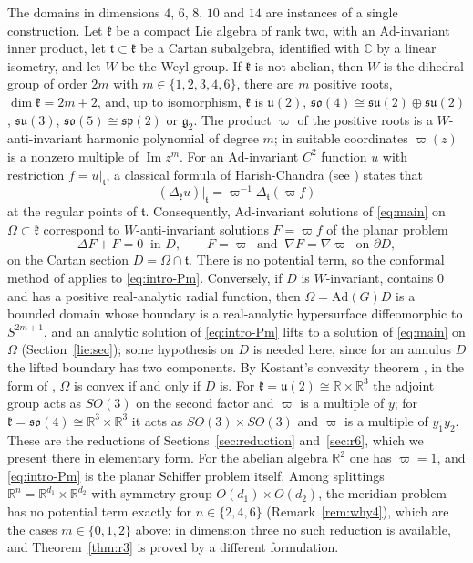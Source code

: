 \documentclass[11pt]{amsart}
\theoremstyle{definition}
\theoremstyle{remark}
\numberwithin{equation}{section}
\newcommand{\R}{\mathbb{R}}
\newcommand{\C}{\mathbb{C}}
\DeclareMathOperator{\im}{Im}
\begin{document}
The domains in dimensions $4$, $6$, $8$, $10$ and $14$ are instances of a single construction. Let $\mathfrak k$ be a compact Lie algebra of rank two, with an $\mathrm{Ad}$-invariant inner product, let $\mathfrak t\subset\mathfrak k$ be a Cartan subalgebra, identified with $\C$ by a linear isometry, and let $W$ be the Weyl group. If $\mathfrak k$ is not abelian, then $W$ is the dihedral group of order $2m$ with $m\in\{1,2,3,4,6\}$, there are $m$ positive roots, $\dim\mathfrak k=2m+2$, and, up to isomorphism, $\mathfrak k$ is $\mathfrak u(2)$, $\mathfrak{so}(4)\cong\mathfrak{su}(2)\oplus\mathfrak{su}(2)$, $\mathfrak{su}(3)$, $\mathfrak{so}(5)\cong\mathfrak{sp}(2)$ or $\mathfrak g_2$. The product $\varpi$ of the positive roots is a $W$-anti-invariant harmonic polynomial of degree $m$; in suitable coordinates $\varpi(z)$ is a nonzero multiple of $\im z^m$. For an $\mathrm{Ad}$-invariant $C^2$ function $u$ with restriction $f=u|_{\mathfrak t}$, a classical formula of Harish-Chandra \cite{HC57} (see \cite[Ch.~II]{Hel84}) states that
\begin{equation}\label{eq:radial-part}
(\Delta_{\mathfrak k}u)|_{\mathfrak t}=\varpi^{-1}\Delta_{\mathfrak t}(\varpi f)
\end{equation}
at the regular points of $\mathfrak t$. Consequently, $\mathrm{Ad}$-invariant solutions of \eqref{eq:main} on $\Omega\subset\mathfrak k$ correspond to $W$-anti-invariant solutions $F=\varpi f$ of the planar problem
\begin{equation}\label{eq:intro-Pm}
\Delta F+F=0\ \text{ in }D,\qquad F=\varpi\ \text{ and }\ \nabla F=\nabla\varpi\ \text{ on }\partial D,
\end{equation}
on the Cartan section $D=\Omega\cap\mathfrak t$. There is no potential term, so the conformal method of \cite{CS26} applies to \eqref{eq:intro-Pm}. Conversely, if $D$ is $W$-invariant, contains $0$ and has a positive real-analytic radial function, then $\Omega=\mathrm{Ad}(G)D$ is a bounded domain whose boundary is a real-analytic hypersurface diffeomorphic to $S^{2m+1}$, and an analytic solution of \eqref{eq:intro-Pm} lifts to a solution of \eqref{eq:main} on $\Omega$ (Section~\ref{lie:sec}); some hypothesis on $D$ is needed here, since for an annulus $D$ the lifted boundary has two components. By Kostant's convexity theorem \cite{Kos73}, in the form of \cite[Theorems~2.2 and~3.6]{Lew00}, $\Omega$ is convex if and only if $D$ is. For $\mathfrak k=\mathfrak u(2)\cong\R\times\R^3$ the adjoint group acts as $SO(3)$ on the second factor and $\varpi$ is a multiple of $y$; for $\mathfrak k=\mathfrak{so}(4)\cong\R^3\times\R^3$ it acts as $SO(3)\times SO(3)$ and $\varpi$ is a multiple of $y_1y_2$. These are the reductions of Sections~\ref{sec:reduction} and~\ref{sec:r6}, which we present there in elementary form. For the abelian algebra $\R^2$ one has $\varpi=1$, and \eqref{eq:intro-Pm} is the planar Schiffer problem itself. Among splittings $\R^n=\R^{d_1}\times\R^{d_2}$ with symmetry group $O(d_1)\times O(d_2)$, the meridian problem has no potential term exactly for $n\in\{2,4,6\}$ (Remark~\ref{rem:why4}), which are the cases $m\in\{0,1,2\}$ above; in dimension three no such reduction is available, and Theorem~\ref{thm:r3} is proved by a different formulation.
\end{document}
